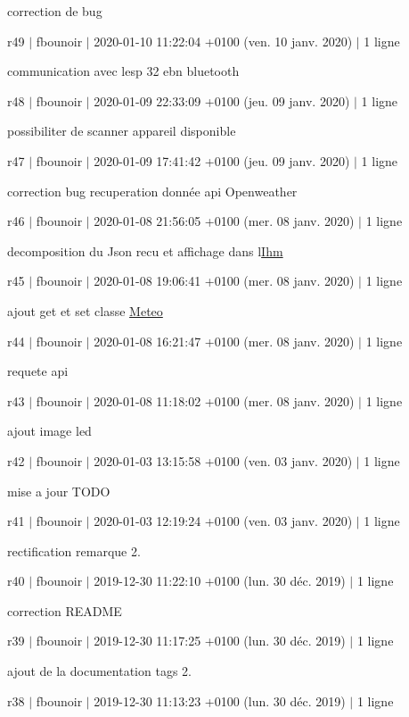 correction de bug

r49 $\vert$ fbounoir $\vert$ 2020-\/01-\/10 11\+:22\+:04 +0100 (ven. 10 janv. 2020) $\vert$ 1 ligne

communication avec l\textquotesingle{}esp 32 ebn bluetooth

r48 $\vert$ fbounoir $\vert$ 2020-\/01-\/09 22\+:33\+:09 +0100 (jeu. 09 janv. 2020) $\vert$ 1 ligne

possibiliter de scanner appareil disponible

r47 $\vert$ fbounoir $\vert$ 2020-\/01-\/09 17\+:41\+:42 +0100 (jeu. 09 janv. 2020) $\vert$ 1 ligne

correction bug recuperation donnée api Openweather

r46 $\vert$ fbounoir $\vert$ 2020-\/01-\/08 21\+:56\+:05 +0100 (mer. 08 janv. 2020) $\vert$ 1 ligne

decomposition du Json recu et affichage dans l\textquotesingle{}\hyperlink{class_ihm}{Ihm}

r45 $\vert$ fbounoir $\vert$ 2020-\/01-\/08 19\+:06\+:41 +0100 (mer. 08 janv. 2020) $\vert$ 1 ligne

ajout get et set classe \hyperlink{class_meteo}{Meteo}

r44 $\vert$ fbounoir $\vert$ 2020-\/01-\/08 16\+:21\+:47 +0100 (mer. 08 janv. 2020) $\vert$ 1 ligne

requete api

r43 $\vert$ fbounoir $\vert$ 2020-\/01-\/08 11\+:18\+:02 +0100 (mer. 08 janv. 2020) $\vert$ 1 ligne

ajout image led

r42 $\vert$ fbounoir $\vert$ 2020-\/01-\/03 13\+:15\+:58 +0100 (ven. 03 janv. 2020) $\vert$ 1 ligne

mise a jour T\+O\+DO

r41 $\vert$ fbounoir $\vert$ 2020-\/01-\/03 12\+:19\+:24 +0100 (ven. 03 janv. 2020) $\vert$ 1 ligne

rectification remarque 2.

r40 $\vert$ fbounoir $\vert$ 2019-\/12-\/30 11\+:22\+:10 +0100 (lun. 30 déc. 2019) $\vert$ 1 ligne

correction R\+E\+A\+D\+ME

r39 $\vert$ fbounoir $\vert$ 2019-\/12-\/30 11\+:17\+:25 +0100 (lun. 30 déc. 2019) $\vert$ 1 ligne

ajout de la documentation tags 2.

r38 $\vert$ fbounoir $\vert$ 2019-\/12-\/30 11\+:13\+:23 +0100 (lun. 30 déc. 2019) $\vert$ 1 ligne

